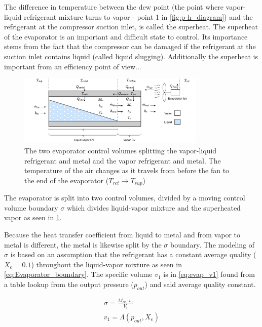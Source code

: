The difference in temperature between the dew point (the point where vapor-liquid refrigerant mixture turns to vapor - point 1 in \cref{fig:p-h_diagram}) and the refrigerant at the compressor suction inlet, is called the superheat.
The superheat of the evaporator is an important and difficult state to control. Its importance stems from the fact that the compressor can be damaged if the refrigerant at the suction inlet contains liquid (called liquid slugging). Additionally the superheat is important from an efficiency point of view... 

\begin{figure}[h]
	\centering
	\includegraphics[width=0.8\textwidth]{Graphics/Evaporator_CV_diagram.pdf}
	\caption{The two evaporator control volumes splitting the vapor-liquid refrigerant and metal and the vapor refrigerant and metal. The temperature of the air changes as it travels from before the fan to the end of the evaporator ($T_{ret} \rightarrow T_{sup}$)}
	\label{fig:evap_CV}
\end{figure}

The evaporator is split into two control volumes, divided by a moving control volume boundary $\sigma$ which divides liquid-vapor mixture and the superheated vapor as seen in \cref{fig:evap_CV}.

Because the heat transfer coefficient from liquid to metal and from vapor to metal is different, the metal is likewise split by the $\sigma$ boundary. The modeling of $\sigma$ is based on an assumption that the refrigerant has a constant average quality ($X_e = 0.1$) throughout the liquid-vapor mixture as seen in \cref{eq:Evaporator_boundary}. The specific volume $v_1$ is in \cref{eq:evap_v1} found from a table lookup from the output pressure ($p_{out}$) and said average quality constant.

\begin{align}
	\sigma = \frac{M_{lv} \cdot v_1}{V_i} \label{eq:Evaporator_boundary} \\
	v_1 = \Lambda(p_{out},X_e) \label{eq:evap_v1}
\end{align}

